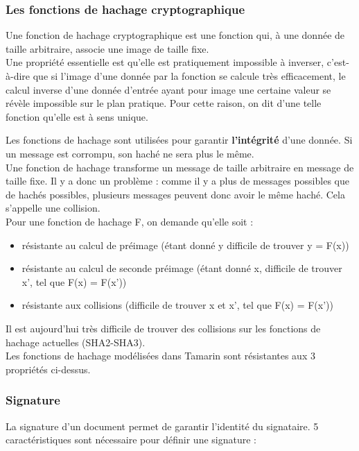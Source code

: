\documentclass[conference]{IEEEtran}
\begin{document}
\vspace{0.3cm}
\subsubsection{Les fonctions de hachage cryptographique}
Une fonction de hachage cryptographique est une fonction qui, à une donnée de taille arbitraire, associe une image de taille fixe. \\Une propriété essentielle est qu'elle est pratiquement impossible à inverser, c'est-à-dire que si l'image d'une donnée par la fonction se calcule très efficacement, le calcul inverse d'une donnée d'entrée ayant pour image une certaine valeur se révèle impossible sur le plan pratique. Pour cette raison, on dit d'une telle fonction qu'elle est à sens unique\cite{wikihash, ryxhash}.

Les fonctions de hachage sont utilisées pour garantir \textbf{l'intégrité} d'une donnée. Si un message est corrompu, son haché ne sera plus le même\cite{igmsign}. \\
Une fonction de hachage transforme un message de taille arbitraire en message de taille fixe. Il y a donc un problème : comme il y a plus de messages possibles que de hachés possibles, plusieurs messages peuvent donc avoir le même haché. Cela s'appelle une collision\cite{ryxhash, cryptohash}. \\
Pour une fonction de hachage F, on demande qu'elle soit :
\begin{itemize}
    \item résistante au calcul de préimage (étant donné y difficile de trouver y = F(x))
    \item résistante au calcul de seconde préimage (étant donné x, difficile de trouver x', tel que F(x) = F(x'))
    \item résistante aux collisions (difficile de trouver x et x', tel que F(x) = F(x'))
\end{itemize}
\vspace{0.2cm}
Il est aujourd'hui très difficile de trouver des collisions sur les fonctions de hachage actuelles (SHA2-SHA3). \\
Les fonctions de hachage modélisées dans Tamarin sont résistantes aux 3 propriétés ci-dessus. \\


\subsubsection{Signature}
La signature d'un document permet de garantir l'identité du signataire. 5 caractéristiques sont nécessaire pour définir une signature \cite{igmsign}:
\end{document}
